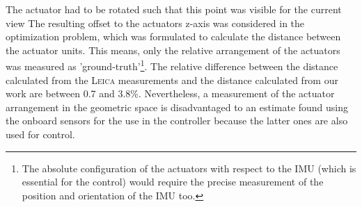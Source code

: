 The actuator had to be rotated such that this point was visible for the current view
The resulting offset to the actuators z-axis was considered in the optimization problem,
which was formulated to calculate the distance between the actuator units.
This means, only the relative arrangement of the actuators was measured as 'ground-truth'\footnote{
The absolute configuration of the actuators with respect to the IMU (which is essential for the control) would require the precise measurement of the position and orientation of the IMU too.}.
The relative difference between the distance calculated from the \textsc{Leica} measurements and the distance calculated from our work are between 0.7 and 3.8\%.
Nevertheless, a measurement of the actuator arrangement in the geometric space is disadvantaged to an estimate found using the onboard sensors for the use in the controller because the latter ones are also used for control.


%
